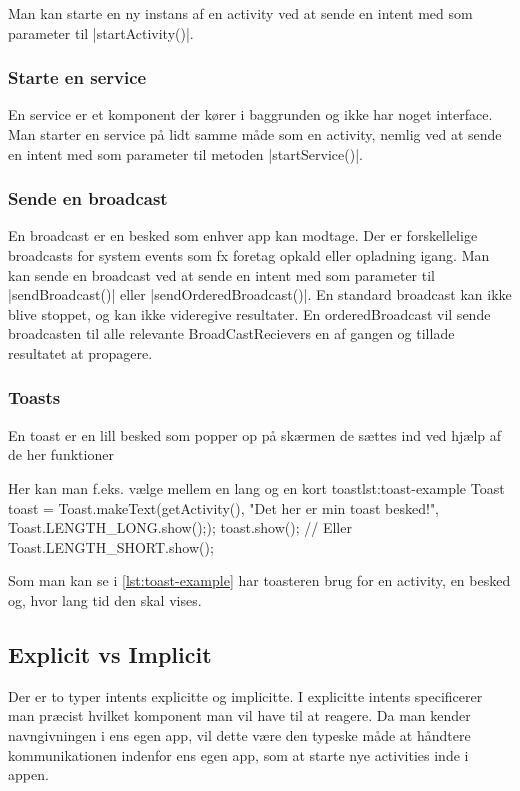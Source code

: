 Man kan starte en ny instans af en activity ved at sende en intent med som parameter til \JavaInline|startActivity()|. 

\subsubsection{Starte en service}

En service er et komponent der kører i baggrunden og ikke har noget interface. Man starter en service på lidt samme måde som en activity, nemlig ved at sende en intent med som parameter til metoden \JavaInline|startService()|.

\subsubsection{Sende en broadcast}

En broadcast er en besked som enhver app kan modtage. Der er forskellelige broadcasts for system events som fx foretag opkald eller opladning igang. Man kan sende en broadcast ved at sende en intent med som parameter til \JavaInline|sendBroadcast()| eller \JavaInline|sendOrderedBroadcast()|.
En standard broadcast kan ikke blive stoppet, og kan ikke videregive resultater. En orderedBroadcast vil sende broadcasten til alle relevante BroadCastRecievers en af gangen og tillade resultatet at propagere.

\subsubsection{Toasts}

En toast er en lill besked som popper op på skærmen de sættes ind ved hjælp af de her funktioner  \begin{JavaCode}{Her kan man f.eks. vælge mellem en lang og en kort toast}{lst:toast-example}
	Toast toast = Toast.makeText(getActivity(), "Det her er min toast besked!", Toast.LENGTH_LONG.show(););
	toast.show();
	// Eller Toast.LENGTH_SHORT.show();
\end{JavaCode}

Som man kan se i \autoref{lst:toast-example} har toasteren brug for en activity, en besked og, hvor lang tid den skal vises.
	
\endJavaCode{}\subsection{Explicit vs Implicit}

Der er to typer intents explicitte og implicitte. I explicitte intents specificerer man præcist hvilket komponent man vil have til at reagere. Da man kender navngivningen i ens egen app, vil dette være den typeske måde at håndtere kommunikationen indenfor ens egen app, som at starte nye activities inde i appen.

